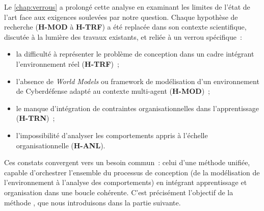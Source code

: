 \noindent
Le \autoref{chap:verrous} a prolongé cette analyse en examinant les limites de l'état de l'art face aux exigences soulevées par notre question. Chaque hypothèse de recherche (\textbf{H-MOD} à \textbf{H-TRF}) a été replacée dans son contexte scientifique, discutée à la lumière des travaux existants, et reliée à un verrou spécifique~:
\begin{itemize}
  \item la difficulté à représenter le problème de conception dans un cadre intégrant l'environnement réel (\textbf{H-TRF})~;
  \item l'absence de \textit{World Models} ou framework de modélisation d'un environnement de Cyberdéfense adapté au contexte multi-agent (\textbf{H-MOD})~;
  \item le manque d'intégration de contraintes organisationnelles dans l'apprentissage (\textbf{H-TRN})~;
  \item l'impossibilité d'analyser les comportements appris à l'échelle organisationnelle (\textbf{H-ANL}).
\end{itemize}

\medskip

\noindent
Ces constats convergent vers un besoin commun~: celui d'une méthode unifiée, capable d'orchestrer l'ensemble du processus de conception (de la modélisation de l'environnement à l'analyse des comportements) en intégrant apprentissage et organisation dans une boucle cohérente. C'est précisément l'objectif de la méthode , que nous introduisons dans la partie suivante.
